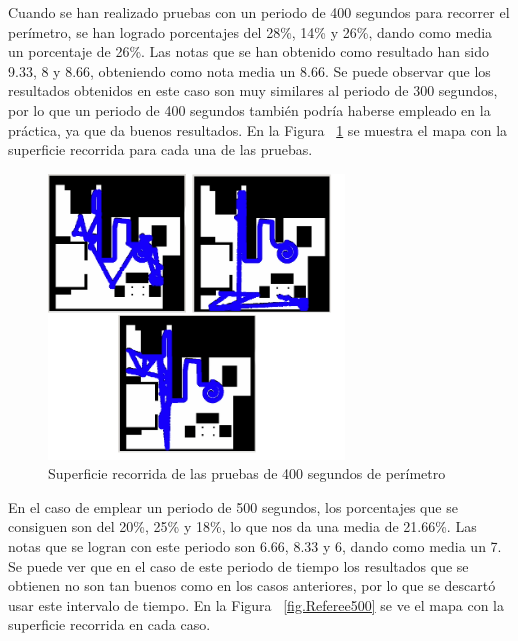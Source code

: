 Cuando se han realizado pruebas con un periodo de 400 segundos para recorrer el perímetro, se han logrado porcentajes del 28\%, 14\% y 26\%, dando como media un porcentaje de 26\%. Las notas que se han obtenido como resultado han sido 9.33, 8 y 8.66, obteniendo como nota media un 8.66. Se puede observar que los resultados obtenidos en este caso son muy similares al periodo de 300 segundos, por lo que un periodo de 400 segundos también podría haberse empleado en la práctica, ya que da buenos resultados. En la Figura ~\ref{fig.Referee400} se muestra el mapa con la superficie recorrida para cada una de las pruebas.

\begin{figure}[H]
  \begin{center}
    \includegraphics[width=0.7\textwidth]{figures/Vacuum/Referee400.png}
		\caption{Superficie recorrida de las pruebas de 400 segundos de perímetro}
		\label{fig.Referee400}
		\end{center}
\end{figure}

En el caso de emplear un periodo de 500 segundos, los porcentajes que se consiguen son del 20\%, 25\% y 18\%, lo que nos da una media de 21.66\%. Las notas que se logran con este periodo son 6.66, 8.33 y 6, dando como media un 7. Se puede ver que en el caso de este periodo de tiempo los resultados que se obtienen no son tan buenos como en los casos anteriores, por lo que se descartó usar este intervalo de tiempo. En la Figura ~\ref{fig.Referee500} se ve el mapa con la superficie recorrida en cada caso.\\

